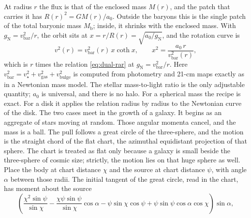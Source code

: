 \documentclass[a4paper]{article}
\begin{document}
At radius $r$ the flux is that of the enclosed mass $M(r)$, and the patch that carries it has $R(r)^2=GM(r)/a_0$. Outside the baryons this is the single patch of the total baryonic mass $M_{\text{b}}$; inside, it shrinks with the enclosed mass. With $g_{\text{N}}=v_{\text{bar}}^2/r$, the orbit sits at $x=r/R(r)=\sqrt{a_0/g_{\text{N}}}$, and the rotation curve is
\begin{equation}
\label{eq:dual-rotation}
v^2(r)=v_{\text{bar}}^2(r)\,x\coth x, \qquad x^2=\frac{a_0\,r}{v_{\text{bar}}^2(r)},
\end{equation}
which is $r$ times the relation \eqref{eq:dual-rar} at $g_{\text{N}}=v_{\text{bar}}^2/r$. Here $v_{\text{bar}}^2=v_\star^2+v_{\text{gas}}^2+v_{\text{bulge}}^2$ is computed from photometry and 21-cm maps exactly as in a Newtonian mass model. The stellar mass-to-light ratio is the only adjustable quantity; $a_0$ is universal, and there is no halo. For a spherical mass the recipe is exact. For a disk it applies the relation radius by radius to the Newtonian curve of the disk. The two cases meet in the growth of a galaxy. It begins as an aggregate of stars moving at random. Those angular momenta cancel, and the mass is a ball. The pull follows a great circle of the three-sphere, and the motion is the straight chord of the flat chart, the azimuthal equidistant projection of that sphere. The chart is treated as flat only because a galaxy is small beside the three-sphere of cosmic size; strictly, the motion lies on that huge sphere as well. Place the body at chart distance $\chi$ and the source at chart distance $\psi$, with angle $\alpha$ between those radii. The initial tangent of the great circle, read in the chart, has moment about the source
\begin{equation}
\label{eq:sphere-chord}
\left(\frac{\chi^{2}\sin\psi}{\sin\chi}-\frac{\chi\psi\sin\psi}{\sin\chi}\cos\alpha-\psi\sin\chi\cos\psi+\psi\sin\psi\cos\alpha\cos\chi\right)\sin\alpha,
\end{equation}
\end{document}
